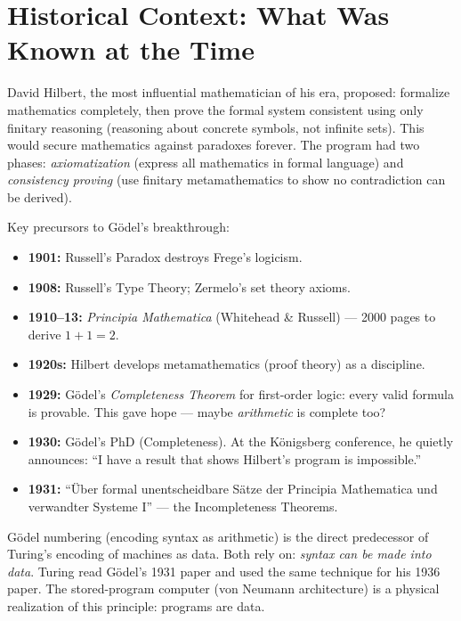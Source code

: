 \section{Historical Context: What Was Known at the Time}
\label{sec:godel:context}

David Hilbert, the most influential mathematician of his era, proposed: formalize mathematics completely, then prove the formal system consistent using only finitary reasoning (reasoning about concrete symbols, not infinite sets). This would secure mathematics against paradoxes forever. The program had two phases: \emph{axiomatization} (express all mathematics in formal language) and \emph{consistency proving} (use finitary metamathematics to show no contradiction can be derived).

Key precursors to Gödel's breakthrough:

\begin{itemize}
\item \textbf{1901:} Russell's Paradox destroys Frege's logicism.
\item \textbf{1908:} Russell's Type Theory; Zermelo's set theory axioms.
\item \textbf{1910--13:} \emph{Principia Mathematica} (Whitehead \& Russell) --- 2000 pages to derive $1+1=2$.
\item \textbf{1920s:} Hilbert develops metamathematics (proof theory) as a discipline.
\item \textbf{1929:} Gödel's \emph{Completeness Theorem} for first-order logic: every valid formula is provable. This gave hope --- maybe \emph{arithmetic} is complete too?
\item \textbf{1930:} Gödel's PhD (Completeness). At the Königsberg conference, he quietly announces: ``I have a result that shows Hilbert's program is impossible.''
\item \textbf{1931:} ``Über formal unentscheidbare Sätze der Principia Mathematica und verwandter Systeme I'' --- the Incompleteness Theorems.
\end{itemize}

Gödel numbering (encoding syntax as arithmetic) is the direct predecessor of Turing's encoding of machines as data. Both rely on: \emph{syntax can be made into data}. Turing read Gödel's 1931 paper and used the same technique for his 1936 paper. The stored-program computer (von Neumann architecture) is a physical realization of this principle: programs are data.

